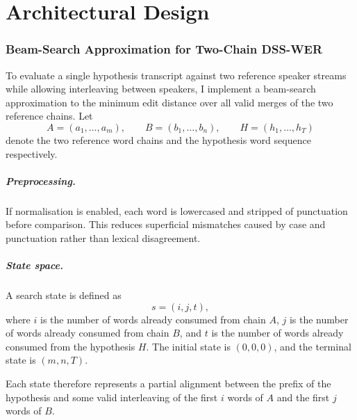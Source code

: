 \chapter{Architectural Design}

\subsection{Beam-Search Approximation for Two-Chain DSS-WER}

To evaluate a single hypothesis transcript against two reference speaker streams while allowing interleaving between speakers, I implement a beam-search approximation to the minimum edit distance over all valid merges of the two reference chains. Let
\begin{equation}
A = (a_1,\dots,a_m), \qquad
B = (b_1,\dots,b_n), \qquad
H = (h_1,\dots,h_T)
\end{equation}
denote the two reference word chains and the hypothesis word sequence respectively.

\paragraph{Preprocessing.}
If normalisation is enabled, each word is lowercased and stripped of punctuation before comparison. This reduces superficial mismatches caused by case and punctuation rather than lexical disagreement.

\paragraph{State space.}
A search state is defined as
\begin{equation}
s = (i,j,t),
\end{equation}
where \(i\) is the number of words already consumed from chain \(A\), \(j\) is the number of words already consumed from chain \(B\), and \(t\) is the number of words already consumed from the hypothesis \(H\). The initial state is \((0,0,0)\), and the terminal state is \((m,n,T)\).

Each state therefore represents a partial alignment between the prefix of the hypothesis and some valid interleaving of the first \(i\) words of \(A\) and the first \(j\) words of \(B\).

